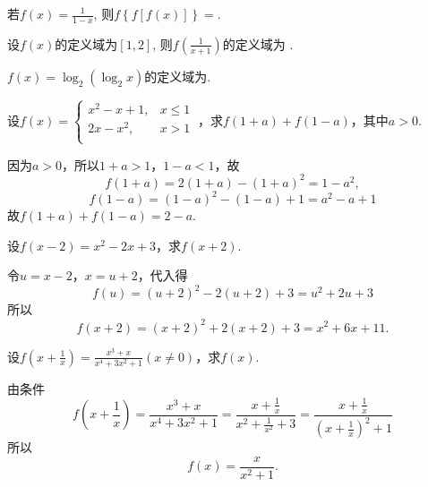 \begin{problem}
	若$\displaystyle f\left( x \right) = \frac{1}{1 - x}$, 则$f\left\{ f\left\lbrack f\left( x \right) \right\rbrack \right\} =$.
\end{problem}

\begin{problem}
	设$f\left( x \right)$的定义域为$\left\lbrack 1,2 \right\rbrack$, 则$\displaystyle f\left( \frac{1}{x + 1} \right)$的定义域为 .
\end{problem}

\begin{problem}
	$f\left( x \right) = \log_{2}\left( \log_{2}x \right)$的定义域为.
\end{problem} 



\begin{problem}
	设$f\left( x \right) = \left\{ \begin{matrix}
	x^{2} - x + 1, & x \leq 1 \\
	2x - x^{2}, & x > 1 \\
	\end{matrix} \right.\ $，求$f\left( 1 + a \right) + f\left( 1 - a \right)$，其中$a > 0$.
	
	
	
	
	\begin{solution} 因为$a > 0$，所以$ 1 + a > 1$，$1 - a < 1$，故
	$$f\left( 1 + a \right) = 2\left( 1 + a \right) - \left( 1 + a \right)^{2} = 1 - a^{2},$$
	$$f\left( 1 - a \right) = \left( 1 - a \right)^{2} - \left( 1 - a \right) + 1 = a^{2} - a + 1$$
	故$f\left( 1 + a \right) + f\left( 1 - a \right) = 2 - a.$
	\end{solution}
\end{problem}    


\begin{problem}
	设$f\left( x - 2 \right) = x^{2} - 2x + 3$，求$f\left( x + 2 \right)$.
	
\begin{solution}
	令$u = x - 2$，$x = u + 2$，代入得$$f\left( u \right) = \left( u + 2 \right)^{2} - 2\left( u + 2 \right) + 3 = u^{2} + 2u + 3$$	
	所以$$f\left( x + 2 \right) = \left( x + 2 \right)^{2} + 2\left( x + 2 \right) + 3 = x^{2} + 6x + 11.$$
\end{solution}	
\end{problem}    


\begin{problem}
	设$\displaystyle f\left( x + \frac{1}{x} \right) = \frac{x^{3} + x}{x^{4} + 3x^{2} + 1}\left( x \neq 0 \right)$，求$f\left( x \right)$.
	
	\begin{solution}由条件
	$$f\left( x + \frac{1}{x} \right) = \frac{x^{3} + x}{x^{4} + 3x^{2} + 1} = \frac{x + \frac{1}{x}}{x^{2} + \frac{1}{x^{2}} + 3} = \frac{x + \frac{1}{x}}{\left( x + \frac{1}{x} \right)^{2} + 1}$$
	所以
	$$f\left( x \right) = \frac{x}{x^{2} + 1}.$$
	\end{solution}
\end{problem}






